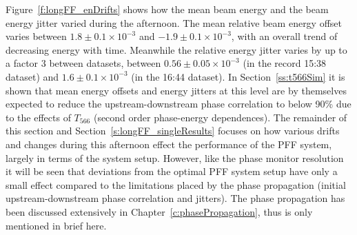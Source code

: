 Figure~\ref{f:longFF_enDrifts} shows how the mean beam energy and the beam energy jitter varied during the afternoon. The mean relative beam energy offset varies between \(1.8\pm0.1\times10^{-3}\) and \(-1.9\pm0.1\times10^{-3}\), with an overall trend of decreasing energy with time. Meanwhile the relative energy jitter varies by up to a factor 3 between datasets, between \(0.56\pm0.05\times10^{-3}\) (in the record 15:38 dataset) and \(1.6\pm0.1\times10^{-3}\) (in the 16:44 dataset). In Section~\ref{ss:t566Sim} it is shown that mean energy offsets and energy jitters at this level are by themselves expected to reduce the upstream-downstream phase correlation to below 90\% due to the effects of \(T_{566}\) (second order phase-energy dependences). The remainder of this section and Section~\ref{s:longFF_singleResults} focuses on how various drifts and changes during this afternoon effect the performance of the PFF system, largely in terms of the system setup. However, like the phase monitor resolution it will be seen that deviations from the optimal PFF system setup have only a small effect compared to the limitations placed by the phase propagation (initial upstream-downstream phase correlation and jitters). The phase propagation has been discussed extensively in Chapter~\ref{c:phasePropagation}, thus is only mentioned in brief here.

